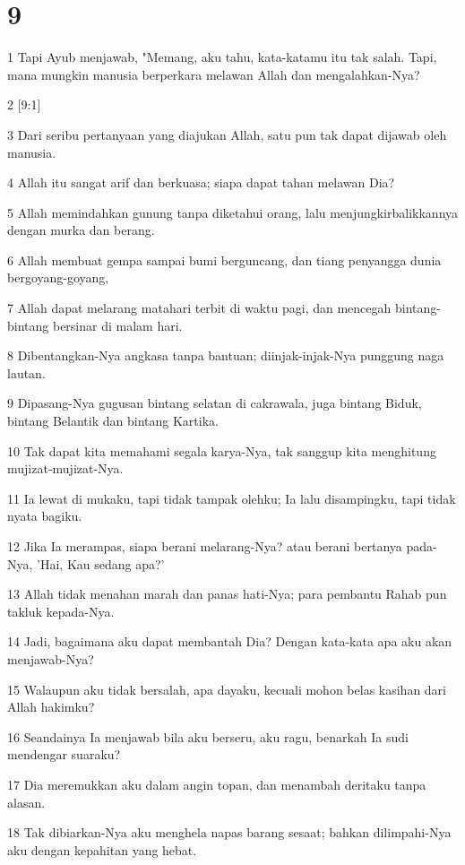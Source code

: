 \chapter{9}

\par 1 Tapi Ayub menjawab, "Memang, aku tahu, kata-katamu itu tak salah. Tapi, mana mungkin manusia berperkara melawan Allah dan mengalahkan-Nya?
\par 2 [9:1]
\par 3 Dari seribu pertanyaan yang diajukan Allah, satu pun tak dapat dijawab oleh manusia.
\par 4 Allah itu sangat arif dan berkuasa; siapa dapat tahan melawan Dia?
\par 5 Allah memindahkan gunung tanpa diketahui orang, lalu menjungkirbalikkannya dengan murka dan berang.
\par 6 Allah membuat gempa sampai bumi berguncang, dan tiang penyangga dunia bergoyang-goyang,
\par 7 Allah dapat melarang matahari terbit di waktu pagi, dan mencegah bintang-bintang bersinar di malam hari.
\par 8 Dibentangkan-Nya angkasa tanpa bantuan; diinjak-injak-Nya punggung naga lautan.
\par 9 Dipasang-Nya gugusan bintang selatan di cakrawala, juga bintang Biduk, bintang Belantik dan bintang Kartika.
\par 10 Tak dapat kita memahami segala karya-Nya, tak sanggup kita menghitung mujizat-mujizat-Nya.
\par 11 Ia lewat di mukaku, tapi tidak tampak olehku; Ia lalu disampingku, tapi tidak nyata bagiku.
\par 12 Jika Ia merampas, siapa berani melarang-Nya? atau berani bertanya pada-Nya, 'Hai, Kau sedang apa?'
\par 13 Allah tidak menahan marah dan panas hati-Nya; para pembantu Rahab pun takluk kepada-Nya.
\par 14 Jadi, bagaimana aku dapat membantah Dia? Dengan kata-kata apa aku akan menjawab-Nya?
\par 15 Walaupun aku tidak bersalah, apa dayaku, kecuali mohon belas kasihan dari Allah hakimku?
\par 16 Seandainya Ia menjawab bila aku berseru, aku ragu, benarkah Ia sudi mendengar suaraku?
\par 17 Dia meremukkan aku dalam angin topan, dan menambah deritaku tanpa alasan.
\par 18 Tak dibiarkan-Nya aku menghela napas barang sesaat; bahkan dilimpahi-Nya aku dengan kepahitan yang hebat.

